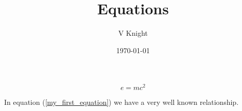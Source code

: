 \documentclass{article}
\title{Equations}
\author{V Knight}
\date{\today}
\begin{document}
\maketitle

\begin{equation}\label{my_first_equation}
    e=mc^2
\end{equation}

In equation (\ref{my_first_equation}) we have a very well known relationship.
\end{document}
